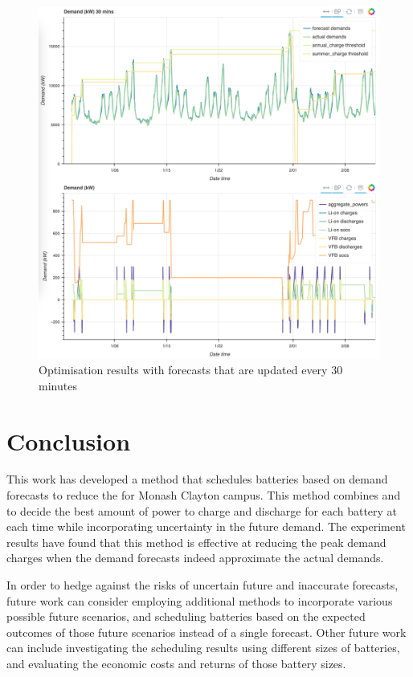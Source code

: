 \begin{figure}[p]
	\centering
	\includegraphics[width=1\linewidth]{pics/30min-forecasts}
	\caption{Optimisation results with forecasts that are updated every 30 minutes}
	\label{fig:30min-forecasts}
\end{figure}


\section{Conclusion}
\label{pdm:conclusion}

This work has developed a method that schedules batteries based on demand forecasts to reduce the  for Monash Clayton campus. This method combines  and  to decide the best amount of power to charge and discharge for each battery at each time while incorporating uncertainty in the future demand. The experiment results have found that this method is effective at reducing the peak demand charges when the demand forecasts indeed approximate the actual demands. 

In order to hedge against the risks of uncertain future and inaccurate forecasts, future work can consider employing additional methods to incorporate various possible future scenarios, and scheduling batteries based on the expected outcomes of those future scenarios instead of a single forecast. Other future work can include investigating the scheduling results using different sizes of batteries, and evaluating the economic costs and returns of those battery sizes. 

